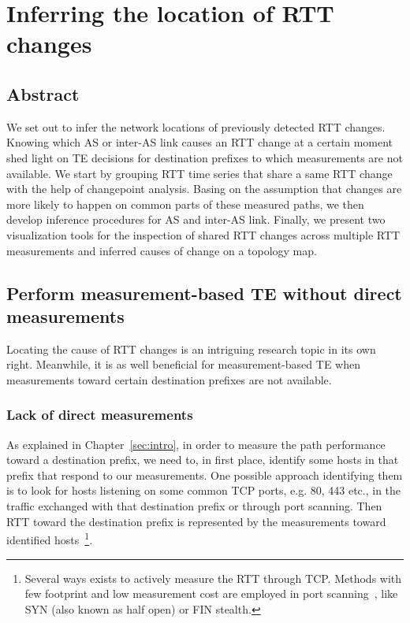 \chapter{Inferring the location of RTT changes}
\label{sec:infer}
\section*{Abstract}
We set out to infer the network locations of previously detected RTT changes.
Knowing which AS or inter-AS link causes an RTT change at a certain moment shed light on TE decisions for destination prefixes to which measurements are not available.
We start by grouping RTT time series that share a same RTT change with the help of changepoint analysis.
Basing on the assumption that changes are more likely to happen on common parts of these measured paths, we then develop inference procedures for AS and inter-AS link.
Finally, we present two visualization tools for the inspection of shared RTT changes across multiple RTT measurements and inferred causes of change on a topology map.
\clearpage

\section{Perform measurement-based TE without direct measurements}
Locating the cause of RTT changes is an intriguing research topic in its own right.
Meanwhile, it is as well beneficial for measurement-based TE when measurements toward certain destination prefixes are not available.

\subsection{Lack of direct measurements}
As explained in Chapter~\ref{sec:intro}, in order to measure the path performance toward a destination prefix, we need to, in first place, identify some hosts in that prefix that respond to our measurements.
One possible approach identifying them is to look for hosts listening on some common TCP ports, e.g. 80, 443 etc., in the traffic exchanged with that destination prefix or through port scanning.
Then RTT toward the destination prefix is represented by the measurements toward identified hosts~\footnote{Several ways exists to actively measure the RTT through TCP. Methods with few footprint and low measurement cost are employed in port scanning~\cite{nmap}, like SYN (also known as half open) or FIN stealth.}.

